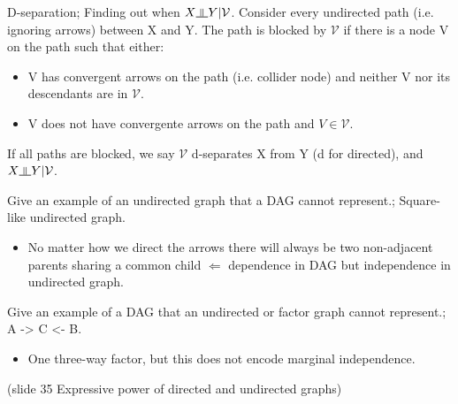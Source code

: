 \documentclass{article}
\newcommand{\indep}{\rotatebox[origin=c]{90}{$\models$}}
\begin{document}
D-separation; Finding out when $X \indep Y | \mathcal{V}$. Consider every undirected path (i.e. ignoring arrows) between X and Y. The path is blocked by $\mathcal{V}$ if there is a node V on the path such that either: \begin{itemize}
	\item V has convergent arrows on the path (i.e. collider node) and neither V nor its descendants are in $\mathcal{V}$.
	\item V does not have convergente arrows on the path and $V\in\mathcal{V}$.
\end{itemize}
If all paths are blocked, we say $\mathcal{V}$ d-separates X from Y (d for directed), and $X \indep Y | \mathcal{V}$.

Give an example of an undirected graph that a DAG cannot represent.; Square-like undirected graph. \begin{itemize}
	\item No matter how we direct the arrows there will always be two non-adjacent parents sharing a common child $\Leftarrow$ dependence in DAG but independence in undirected graph.
\end{itemize}

Give an example of a DAG that an undirected or factor graph cannot represent.; A -> C <- B. \begin{itemize}
	\item One three-way factor, but this does not encode marginal independence.	
\end{itemize}

(slide 35 Expressive power of directed and undirected graphs)
\end{document}
